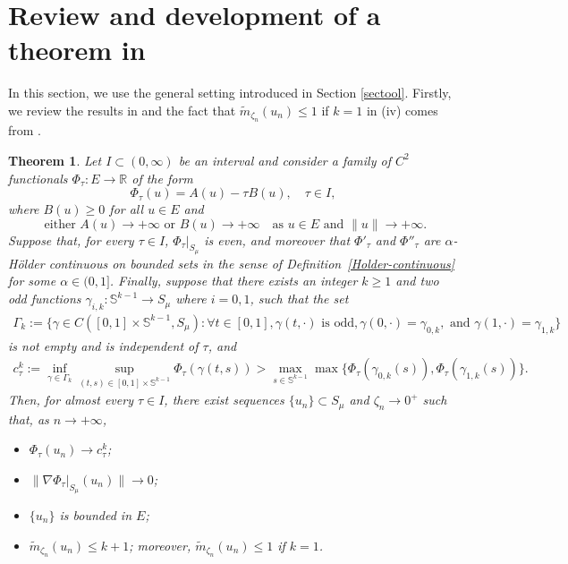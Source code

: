 \documentclass[10pt,a4paper]{article}
\newtheorem{theorem}{Theorem}[section]
\theoremstyle{definition} \theoremstyle{remark}
\numberwithin{equation}{section}
\newcommand{\R}{\mathbb{R}}
\newcommand{\s}{\mathbb{S}}
\begin{document}
\section{Review and development of a theorem in \cite{BCJN}} \label{secreview}

In this section, we use the general setting introduced in Section \ref{sectool}. Firstly, we review the results in \cite[Theorem 1.12]{BCJN} and the fact that $\tilde m_{\zeta_n}(u_n) \leq 1$ if $k =1$ in (iv) comes from \cite[Theorem 1.5]{BCJN}.

\begin{theorem}\label{Objective1}
    Let $I\subset (0,\infty)$ be an interval and consider a family of $C^2$ functionals $\Phi_\tau\colon E\to \R$ of the form
	\begin{equation*}
		\Phi_\tau(u)=A(u)-\tau B(u),\quad \tau\in I,
	\end{equation*}
	where $B(u)\geq 0$ for all $u\in E$ and
	\begin{equation}\label{hp coer}
		\text{ either } A(u) \to +\infty
		\text{ or } B(u) \to +\infty
		\quad \text{as } u \in E \text{ and }
		\|u\| \to +\infty.
	\end{equation}
	Suppose that, for every $\tau \in I$, $\Phi_\tau|_{S_\mu}$ is even, and moreover that $\Phi'_\tau$ and $\Phi''_\tau$ are
	$\alpha$-H\"older continuous on bounded sets in the sense of
	Definition~\ref{Holder-continuous} for some
	$\alpha \in (0,1]$. Finally, suppose that there exists an integer $k \geq 1$ and two odd functions
	$\gamma_{i,k} : \mathbb{S}^{k-1} \to S_{\mu}$ where $i =0,1$, such
	that the set
	\begin{align} \label{SMP1}
		\Gamma_k := \big\{\gamma \in C([0,1]\times \s^{k-1}, S_\mu):  \forall t \in [0,1], \gamma(t,\cdot) \text{ is odd}, \gamma(0,\cdot) = \gamma_{0,k}, \text{ and } \gamma(1,\cdot) = \gamma_{1,k}\big\}
	\end{align}
	is not empty and is independent of $\tau$, and
	\begin{align} \label{SMP2}
		c_{\tau}^k := \inf_{\gamma \in \Gamma_k}\sup_{(t,s) \in [0,1]\times\s^{k-1}}\Phi_\tau(\gamma(t,s)) > \max_{s\in \s^{k-1}}\max\bigl\{\Phi_\tau(\gamma_{0,k}(s)), \Phi_\tau(\gamma_{1,k}(s))\bigr\}.
	\end{align}
	Then, for almost every $\tau \in I$, there exist sequences
	$\{u_n\} \subset S_\mu$ and $\zeta_n \to 0^+$ such that, as
	$n \to + \infty$,
	\begin{itemize}
		\item[(i)] $\Phi_\tau(u_n) \to c_{\tau}^k$;
		\item[(ii)] $\bigl\| \nabla \Phi_\tau|_{S_\mu}(u_n)\| \to 0$;
		\item[(iii)] $\{u_n\}$ is bounded in $E$;
		\item[(iv)] $\tilde m_{\zeta_n}(u_n) \leq k+1$; moreover, $\tilde m_{\zeta_n}(u_n) \leq 1$ if $k =1$.
	\end{itemize}
\end{theorem}
\end{document}
